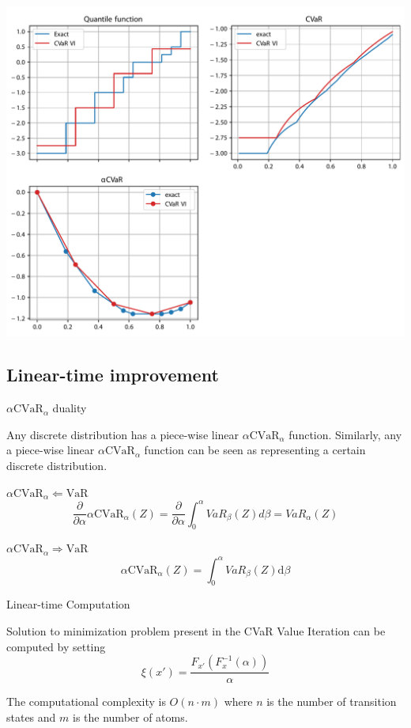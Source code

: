\documentclass{beamer}
\newcommand{\cvar}{\text{CVaR}}
\newcommand{\var}{\text{VaR}}
\newcommand{\dt}{\text{d}}
\begin{document}
\begin{frame}
\center
\includegraphics[width=0.8\linewidth]{../gfx/exactvarcvar.pdf}

\end{frame}



\subsection{Linear-time improvement}

\begin{frame}{$\alpha\cvar_\alpha$ duality}
\begin{lemma}
Any discrete distribution has a piece-wise linear $\alpha\cvar_\alpha$ function. Similarly, any a piece-wise linear $\alpha\cvar_\alpha$ function can be seen as representing a certain discrete distribution.
\end{lemma}

\begin{block}{$\alpha\cvar_\alpha 	\Leftarrow \var$}
$$\dfrac{\partial}{\partial \alpha} \alpha \cvar_\alpha(Z) = \dfrac{\partial}{\partial \alpha} \int_0^\alpha VaR_\beta(Z) d\beta = VaR_\alpha(Z)$$
\end{block}


\begin{block}{$\alpha\cvar_\alpha 	\Rightarrow \var$}
$$\alpha \cvar_\alpha(Z) = \int_0^\alpha VaR_\beta(Z) \dt \beta$$
\end{block}

\end{frame}


\begin{frame}{Linear-time Computation}

\begin{theorem}
Solution to minimization problem present in the CVaR Value Iteration can be computed by setting
$$\xi ( x' ) = \dfrac{F_{x'}(F^{-1}_x(\alpha))}{\alpha} $$

The computational complexity is $O(n\cdot m)$ where $n$ is the number of transition states and $m$ is the number of atoms.
\end{theorem}
\end{frame}
\end{document}
